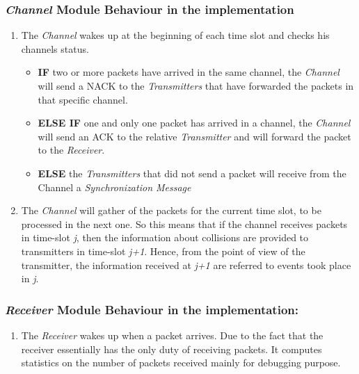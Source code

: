\subsubsection{\textit{Channel} Module Behaviour in the implementation}
\begin{enumerate}
	\item The \textit{Channel} wakes up at the beginning of each time slot and checks his channels status.
	\begin{itemize}
		\item \textbf{IF} two or more packets have arrived in the same channel, the \textit{Channel} will send a NACK to the \textit{Transmitters} that have forwarded the packets in that specific channel.
		\item \textbf{ELSE IF} one and only one packet has arrived in a channel, the \textit{Channel} will send an ACK to the relative \textit{Transmitter} and will forward the packet to the \textit{Receiver}.
		\item \textbf{ELSE} the \textit{Transmitters} that did not send a packet will receive from the Channel a \textit{Synchronization Message}
	\end{itemize}
	\item The \textit{Channel} will gather of the packets for the current time slot, to be processed in the next one. So this means that if the channel receives packets in time-slot \emph{j}, then the information about collisions are provided to transmitters in time-slot \emph{j+1}. Hence, from the point of view of the transmitter, the information received at \emph{j+1} are referred to events took place in \emph{j}.
\end{enumerate}
\subsubsection{\textit{Receiver} Module Behaviour in the implementation:}
\begin{enumerate}
	\item The \textit{Receiver} wakes up when a packet arrives. Due to the fact that the receiver essentially has the only duty of receiving packets. It computes statistics on the number of packets received mainly for debugging purpose.
\end{enumerate}